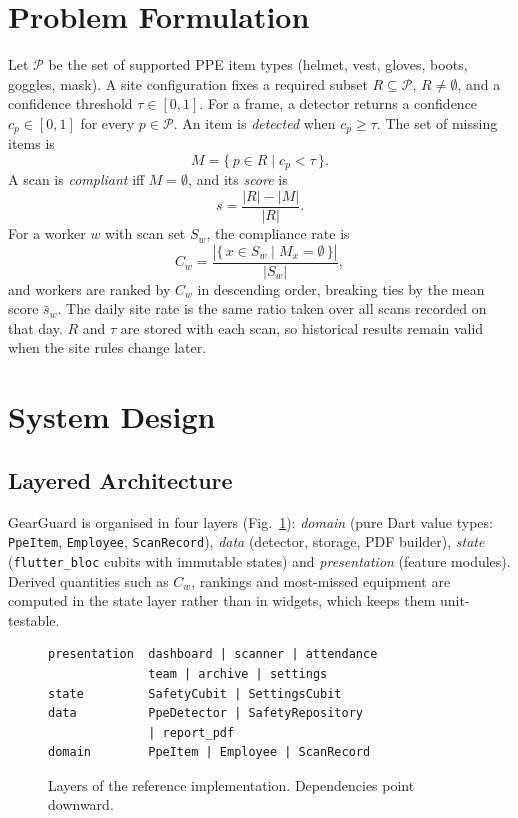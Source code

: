 \documentclass[conference]{IEEEtran}
\begin{document}
\section{Problem Formulation}
Let $\mathcal{P}$ be the set of supported PPE item types (helmet, vest, gloves,
boots, goggles, mask). A site configuration fixes a required subset
$R \subseteq \mathcal{P}$, $R \neq \emptyset$, and a confidence threshold
$\tau \in [0,1]$. For a frame, a detector returns a confidence
$c_p \in [0,1]$ for every $p \in \mathcal{P}$. An item is \emph{detected} when
$c_p \ge \tau$. The set of missing items is
\begin{equation}
M = \{\, p \in R \mid c_p < \tau \,\}.
\end{equation}
A scan is \emph{compliant} iff $M=\emptyset$, and its \emph{score} is
\begin{equation}
s = \frac{|R| - |M|}{|R|}.
\end{equation}
For a worker $w$ with scan set $S_w$, the compliance rate is
\begin{equation}
C_w = \frac{|\{\, x \in S_w \mid M_x=\emptyset \,\}|}{|S_w|},
\end{equation}
and workers are ranked by $C_w$ in descending order, breaking ties by the mean
score $\bar{s}_w$. The daily site rate is the same ratio taken over all scans
recorded on that day. $R$ and $\tau$ are stored with each scan, so historical
results remain valid when the site rules change later.

\section{System Design}
\subsection{Layered Architecture}
GearGuard is organised in four layers (Fig.~\ref{fig:arch}): \emph{domain}
(pure Dart value types: \texttt{PpeItem}, \texttt{Employee},
\texttt{ScanRecord}), \emph{data} (detector, storage, PDF builder),
\emph{state} (\texttt{flutter\_bloc} cubits with immutable states) and
\emph{presentation} (feature modules). Derived quantities such as $C_w$,
rankings and most-missed equipment are computed in the state layer rather than
in widgets, which keeps them unit-testable.

\begin{figure}[t]
\centering
\begin{lstlisting}
presentation  dashboard | scanner | attendance
              team | archive | settings
state         SafetyCubit | SettingsCubit
data          PpeDetector | SafetyRepository
              | report_pdf
domain        PpeItem | Employee | ScanRecord
\end{lstlisting}
\caption{Layers of the reference implementation. Dependencies point downward.}
\label{fig:arch}
\end{figure}
\end{document}
